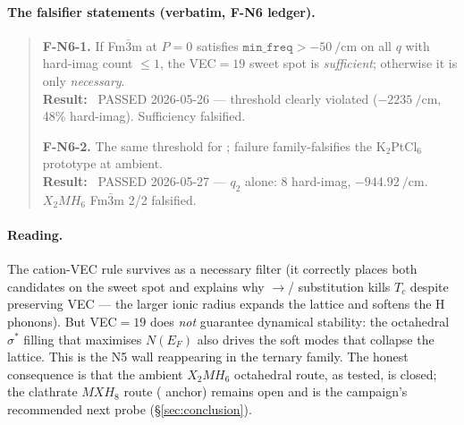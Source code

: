 \paragraph{The falsifier statements (verbatim, F-N6 ledger).}
\begin{quote}\small
\textbf{F-N6-1.} If  Fm$\bar{3}$m at $P=0$ satisfies
$\texttt{min\_freq} > -\SI{50}{\per\centi\meter}$ on all $q$ with
hard-imag count $\le 1$, the VEC$=19$ sweet spot is \emph{sufficient};
otherwise it is only \emph{necessary}.\\
\textbf{Result:} \tierRed\ PASSED 2026-05-26 --- threshold clearly violated
($-\SI{2235}{\per\centi\meter}$, 48\% hard-imag). Sufficiency falsified.

\medskip
\textbf{F-N6-2.} The same threshold for ; failure
family-falsifies the K$_2$PtCl$_6$ prototype at ambient.\\
\textbf{Result:} \tierRed\ PASSED 2026-05-27 --- $q_2$ alone: 8 hard-imag,
$-\SI{944.92}{\per\centi\meter}$. $X_2MH_6$ Fm$\bar{3}$m 2/2 falsified.
\end{quote}

\paragraph{Reading.}
The cation-VEC rule survives as a necessary filter (it correctly places both
candidates on the sweet spot and explains why $\to$/
substitution kills $T_c$ despite preserving VEC --- the larger ionic radius
expands the lattice and softens the H phonons). But VEC$=19$ does \emph{not}
guarantee dynamical stability: the octahedral $\sigma^\ast$ filling that
maximises $N(E_F)$ also drives the soft modes that collapse the lattice. This
is the N5 wall reappearing in the ternary family. The honest consequence is
that the ambient $X_2MH_6$ octahedral route, as tested, is closed; the
clathrate $MXH_8$ route ( anchor) remains open and is the
campaign's recommended next probe (\S\ref{sec:conclusion}).
